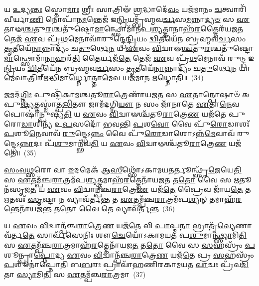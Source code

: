 𑌯 \ul{𑌉}\-𑌦𑍍𑌯\-\ul{𑌨𑍍𑌤𑌃} 𑌸𑍍𑌤𑍋\-\ul{𑌮𑌾𑌃} 𑌶𑍍𑌰𑍀𑌃 𑌸𑌾𑌤𑍍𑌰𑌿𑍟᳴ \ul{𑌶𑍍𑌰}\-𑌦𑍍𑌧𑌾𑌦𑍇᳴\-\ul{𑌵𑌂} 𑌯𑌜᳴𑌮𑌾𑌨𑌂 \ul{𑌚}\-𑌤𑍍𑌵𑌾𑌰𑌿᳴ 𑌵𑍀𑌰𑍍𑌯𑌾\-\ul{𑌣𑌿} 𑌨𑍋𑌪𑌾᳴𑌨\-\ul{𑌮}\-𑌨𑍍𑌤𑍇𑌜᳴ 𑌇\-\ul{𑌨𑍍𑌦𑍍𑌰𑌿}\-𑌯𑌮𑍍𑌬𑍍𑌰᳴𑌹𑍍𑌮𑌵\-\ul{𑌰𑍍𑌚}\-𑌸\-\ul{𑌮}\-𑌨𑍍𑌨𑌾\-\ul{𑌦𑍍𑌯}\-\-\ul{𑍞} 𑌸 \ul{𑌏}\-𑌤𑌾𑍟\-\ul{𑌶𑍍𑌚}\-𑌤𑍁\-\ul{𑌰}\-𑌶𑍍𑌚𑌤𑍁᳴𑌷𑍍𑌟𑍋\-\ul{𑌮𑌾}\-𑌨𑍍𑌥𑍍𑌸𑍋𑌮𑌾᳴𑌨𑌪\-\ul{𑌶𑍍𑌯}\-𑌤𑍍𑌤𑌾𑌨𑌾𑌹᳴\-\ul{𑌰}\-𑌤𑍍𑌤𑍈𑌰᳴𑌯𑌜\-\ul{𑌤} 𑌤𑍇𑌜᳴ \ul{𑌏}\-𑌵 𑌪𑍍𑌰᳴\-\ul{𑌥}\-𑌮𑍇𑌨𑌾𑌵𑌾᳴𑌰𑍁𑌨𑍍𑌦𑍍𑌧𑍇\-\ul{𑌨𑍍𑌦𑍍𑌰𑌿}\-𑌯𑌂 \ul{𑌦𑍍𑌵𑌿}\-𑌤𑍀𑌯𑍇᳴𑌨 𑌬𑍍𑌰𑌹𑍍𑌮𑌵\-\ul{𑌰𑍍𑌚}\-𑌸𑌂 \ul{𑌤𑍃}\-𑌤𑍀𑌯𑍇᳴\-\ul{𑌨𑌾}\-𑌨𑍍𑌨𑌾𑌦𑍍𑌯𑌂᳴ 𑌚\-\ul{𑌤𑍁}\-𑌰𑍍𑌥𑍇\-\ul{𑌨} 𑌯 \ul{𑌏}\-𑌵𑌂 \ul{𑌵𑌿}\-𑌦𑍍𑌵𑌾𑍟\-\ul{𑌶𑍍𑌚}\-𑌤𑍁\-\ul{𑌰}\-𑌶𑍍𑌚𑌤𑍁᳴𑌷𑍍𑌟𑍋\-\ul{𑌮𑌾}\-𑌨𑍍𑌥𑍍𑌸𑍋𑌮𑌾᳴\-\ul{𑌨𑌾}\-𑌹𑌰᳴\-\ul{𑌤𑌿} 𑌤𑍈𑌰𑍍𑌯𑌜᳴\-\ul{𑌤𑍇} 𑌤𑍇𑌜᳴ \ul{𑌏}\-𑌵 𑌪𑍍𑌰᳴\-\ul{𑌥}\-𑌮𑍇𑌨𑌾𑌵᳴ 𑌰𑍁𑌨𑍍𑌦𑍍𑌧 𑌇\-\ul{𑌨𑍍𑌦𑍍𑌰𑌿}\-𑌯𑌂 \ul{𑌦𑍍𑌵𑌿}\-𑌤𑍀𑌯𑍇᳴𑌨 𑌬𑍍𑌰𑌹𑍍𑌮𑌵\-\ul{𑌰𑍍𑌚}\-𑌸𑌂 \ul{𑌤𑍃}\-𑌤𑍀𑌯𑍇᳴\-\ul{𑌨𑌾}\-𑌨𑍍𑌨𑌾𑌦𑍍𑌯𑌂᳴ 𑌚\-\ul{𑌤𑍁}\-𑌰𑍍𑌥𑍇\-\ul{𑌨} 𑌯𑌾\-\ul{𑌮𑍇}\-𑌵𑌾\-\ul{𑌤𑍍𑌰𑌿}\-𑌰𑍍\mbox{}𑌋\-\ul{𑌦𑍍𑌧𑌿}\-𑌮𑌾\-\ul{𑌰𑍍𑌧𑍍𑌨𑍋}\-𑌤𑍍𑌤𑌾\-\ul{𑌮𑍇}\-𑌵 𑌯𑌜᳴𑌮𑌾𑌨 𑌋𑌧𑍍𑌨𑍋𑌤𑌿॥~(34)

{\anuvakamend[{𑌤𑌤𑍍𑌤𑍇𑌜᳴ \ul{𑌏}\-𑌵𑌾𑌷𑍍𑌟𑌾𑌦᳴𑌶 𑌚}]}%

\-\ul{𑌜}\-𑌮𑌦᳴\-\ul{𑌗𑍍𑌨𑌿𑌃} 𑌪𑍁𑌷𑍍𑌟𑌿᳴𑌕𑌾𑌮𑌶𑍍𑌚𑌤𑍂\-\ul{𑌰𑌾}\-𑌤𑍍𑌰𑍇𑌣𑌾᳴𑌯𑌜\-\ul{𑌤} 𑌸 \ul{𑌏}\-𑌤𑌾𑌨𑍍𑌪𑍋𑌷𑌾𑍞᳴ 𑌅𑌪𑍁\-\ul{𑌷𑍍𑌯}\-𑌤𑍍𑌤𑌸𑍍𑌮𑌾॑𑌤𑍍𑌪\-\ul{𑌲𑌿}\-𑌤𑍗 𑌜𑌾𑌮᳴𑌦𑌗𑍍𑌨𑌿\-\ul{𑌯𑍗} 𑌨 𑌸𑌂 𑌜𑌾᳴𑌨𑌾𑌤𑍇 \ul{𑌏}\-𑌤𑌾\-\ul{𑌨𑍇}\-𑌵 𑌪𑍋𑌷𑌾॑𑌨𑍍𑌪𑍁𑌷𑍍𑌯\-\ul{𑌤𑌿} 𑌯 \ul{𑌏}\-𑌵𑌂 \ul{𑌵𑌿}\-𑌦𑍍𑌵𑌾𑍟𑌶𑍍𑌚᳴𑌤𑍂\-\ul{𑌰𑌾}\-𑌤𑍍𑌰𑍇\-\ul{𑌣} 𑌯𑌜᳴𑌤𑍇 𑌪𑍁𑌰𑍋\-\ul{𑌡𑌾}\-𑌶𑌿𑌨𑍍𑌯᳴ 𑌉\-\ul{𑌪}\-𑌸𑌦𑍋᳴ 𑌭𑌵𑌨𑍍𑌤𑌿 \ul{𑌪}\-𑌶\-\ul{𑌵𑍋} 𑌵𑍈 𑌪𑍁᳴\-\ul{𑌰𑍋}\-𑌡𑌾𑌶𑌃᳴ \ul{𑌪}\-𑌶𑍂\-\ul{𑌨𑍇}\-𑌵𑌾𑌵᳴ \ul{𑌰𑍁}\-𑌨𑍍𑌦𑍍𑌧𑍇\-𑌽\-\ul{𑌨𑍍𑌨𑌂} 𑌵𑍈 𑌪𑍁᳴\-\ul{𑌰𑍋}\-𑌡𑌾𑌶𑍋\-𑌽𑌨𑍍𑌨᳴\-\ul{𑌮𑍇}\-𑌵𑌾𑌵᳴ 𑌰𑍁𑌨𑍍𑌦𑍍𑌧𑍇\-𑌽\-\ul{𑌨𑍍𑌨𑌾}\-𑌦𑌃 𑌪᳴\-\ul{𑌶𑍁}\-𑌮𑌾𑌨𑍍𑌭᳴𑌵\-\ul{𑌤𑌿} 𑌯 \ul{𑌏}\-𑌵𑌂 \ul{𑌵𑌿}\-𑌦𑍍𑌵𑌾𑍟𑌶𑍍𑌚᳴𑌤𑍂\-\ul{𑌰𑌾}\-𑌤𑍍𑌰𑍇\-\ul{𑌣} 𑌯𑌜᳴𑌤𑍇॥~(35)

{\anuvakamend[{\-\ul{𑌜}\-𑌮𑌦᳴𑌗𑍍𑌨𑌿\-\ul{𑌰}\-𑌷𑍍𑌟𑌾𑌚᳴𑌤𑍍𑌵𑌾𑌰𑌿𑍞𑌶𑌤𑍍}]}%

\-\ul{𑌸𑌂}\-\-\ul{𑌵}\-\-\ul{𑌥𑍍𑌸}\-𑌰𑍋 𑌵𑌾 \ul{𑌇}\-𑌦𑌮𑍇𑌕᳴ 𑌆\-\ul{𑌸𑍀}\-𑌥𑍍𑌸𑍋᳴\-𑌽𑌕𑌾𑌮𑌯\-\ul{𑌤}\-𑌰𑍍𑌤𑍂𑌨𑍍𑌥𑍍𑌸𑍃᳴\-\ul{𑌜𑍇}\-𑌯𑍇\-\ul{𑌤𑌿} 𑌸 \ul{𑌏}\-𑌤𑌮𑍍𑌪᳴𑌞𑍍𑌚\-\ul{𑌰𑌾}\-𑌤𑍍𑌰𑌮᳴𑌪\-\ul{𑌶𑍍𑌯}\-𑌤𑍍𑌤𑌮𑌾𑌹᳴\-\ul{𑌰}\-𑌤𑍍𑌤𑍇𑌨𑌾᳴𑌯𑌜\-\ul{𑌤} 𑌤\-\ul{𑌤𑍋} 𑌵𑍈 𑌸 \ul{𑌋}\-𑌤𑍂𑌨᳴𑌸𑍃𑌜\-\ul{𑌤} 𑌯 \ul{𑌏}\-𑌵𑌂 \ul{𑌵𑌿}\-𑌦𑍍𑌵𑌾𑌨𑍍𑌪᳴𑌞𑍍𑌚\-\ul{𑌰𑌾}\-𑌤𑍍𑌰𑍇\-\ul{𑌣} 𑌯𑌜᳴\-\ul{𑌤𑍇} 𑌪𑍍𑌰𑍈𑌵 𑌜𑌾᳴𑌯\-\ul{𑌤𑍇} 𑌤 \ul{𑌋}\-𑌤𑌵𑌃᳴ \ul{𑌸𑍃}\-𑌷𑍍𑌟𑌾 𑌨 𑌵𑍍𑌯𑌾𑌵᳴𑌰𑍍𑌤\-\ul{𑌨𑍍𑌤} 𑌤 \ul{𑌏}\-𑌤𑌮𑍍𑌪᳴𑌞𑍍𑌚\-\ul{𑌰𑌾}\-𑌤𑍍𑌰𑌮᳴𑌪\-\ul{𑌶𑍍𑌯}\-𑌨𑍍 𑌤𑌮𑌾𑌹᳴\-\ul{𑌰}\-𑌨𑍍𑌤𑍇𑌨𑌾᳴𑌯𑌜\-\ul{𑌨𑍍𑌤} 𑌤\-\ul{𑌤𑍋} 𑌵𑍈 𑌤𑍇 𑌵𑍍𑌯𑌾𑌵᳴𑌰𑍍𑌤𑌨𑍍𑌤~(36)

𑌯 \ul{𑌏}\-𑌵𑌂 \ul{𑌵𑌿}\-𑌦𑍍𑌵𑌾𑌨𑍍𑌪᳴𑌞𑍍𑌚\-\ul{𑌰𑌾}\-𑌤𑍍𑌰𑍇\-\ul{𑌣} 𑌯𑌜᳴\-\ul{𑌤𑍇} 𑌵𑌿 \ul{𑌪𑌾}\-𑌪𑍍𑌮\-\ul{𑌨𑌾} 𑌭𑍍𑌰𑌾𑌤𑍃᳴\-\ul{𑌵𑍍𑌯𑍇}\-𑌣𑌾 𑌵᳴𑌰𑍍𑌤\-\ul{𑌤𑍇} 𑌸𑌾𑌰𑍍𑌵᳴𑌸𑍇𑌨𑌿𑌃 𑌶𑍗\-\ul{𑌚𑍇}\-𑌯𑍋᳴\-𑌽𑌕𑌾𑌮𑌯𑌤 𑌪\-\ul{𑌶𑍁}\-𑌮𑌾\-\ul{𑌨𑍍𑌥𑍍𑌸𑍍𑌯𑌾}\-𑌮𑌿\-\ul{𑌤𑌿} 𑌸 \ul{𑌏}\-𑌤𑌮𑍍𑌪᳴𑌞𑍍𑌚\-\ul{𑌰𑌾}\-𑌤𑍍𑌰𑌮𑌾𑌹᳴\-\ul{𑌰}\-𑌤𑍍𑌤𑍇𑌨𑌾᳴𑌯𑌜\-\ul{𑌤} 𑌤\-\ul{𑌤𑍋} 𑌵𑍈 𑌸 \ul{𑌸}\-𑌹𑌸𑍍𑌰𑌂᳴ \ul{𑌪}\-𑌶𑍂𑌨𑍍𑌪𑍍𑌰𑌾\-\ul{𑌪𑍍𑌨𑍋}\-𑌦𑍍𑌯 \ul{𑌏}\-𑌵𑌂 \ul{𑌵𑌿}\-𑌦𑍍𑌵𑌾𑌨𑍍𑌪᳴𑌞𑍍𑌚\-\ul{𑌰𑌾}\-𑌤𑍍𑌰𑍇\-\ul{𑌣} 𑌯𑌜᳴\-\ul{𑌤𑍇} 𑌪𑍍𑌰 \ul{𑌸}\-𑌹𑌸𑍍𑌰𑌂᳴ \ul{𑌪}\-𑌶𑍂𑌨𑌾॑𑌪𑍍𑌨𑍋𑌤𑌿 𑌬\-\ul{𑌬}\-𑌰𑌃 𑌪𑍍𑌰𑌾𑌵𑌾᳴𑌹𑌣𑌿𑌰𑌕𑌾𑌮𑌯𑌤 \ul{𑌵𑌾}\-𑌚𑌃 𑌪𑍍𑌰᳴𑌵\-\ul{𑌦𑌿}\-𑌤𑌾 \ul{𑌸𑍍𑌯𑌾}\-𑌮𑌿\-\ul{𑌤𑌿} 𑌸 \ul{𑌏}\-𑌤𑌮𑍍𑌪᳴𑌞𑍍𑌚\-\ul{𑌰𑌾}\-𑌤𑍍𑌰𑌮𑌾~(37)


